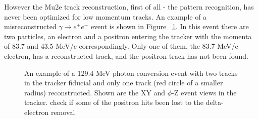 However the Mu2e track reconstruction, first of all - the pattern recognition, has never
been optimized for low momentum tracks. An example of a misreconstructed $\gamma \to e^+e^-$
event is shown in Figure ~\ref{figure:event_display}. In this event there are two particles,
an electron and a positron entering the tracker with the momenta of 83.7 and 43.5 MeV/c
correspondingly. Only one of them, the 83.7 MeV/c electron, has a reconstructed track, and 
the positron track has not been found.  

\begin{figure}[H]
  \caption{
    \label{figure:sum_mom_vd13}
    An example of a 129.4 MeV photon conversion event with two tracks
    in the tracker fiducial and only one track (red circle of a smaller radius)
    reconstructed. Shown are the XY and $\phi$-Z event views in the tracker.
    {\red check if some of the positron hits been lost to the delta-electron removal}
  }
  \label{figure:event_display}
\end{figure}

